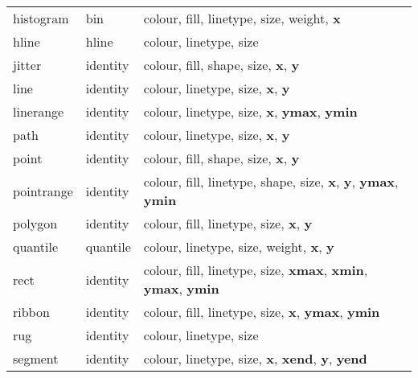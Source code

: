 \begin{table}
\begin{center}
\begin{tabular}{llp{3in}}
  histogram  & bin       & colour, fill, linetype, size, weight, \textbf{x}                                                                          \\
  hline      & hline     & colour, linetype, size                                                                                                     \\
  jitter     & identity  & colour, fill, shape, size, \textbf{x}, \textbf{y}                                                                        \\
  line       & identity  & colour, linetype, size, \textbf{x}, \textbf{y}                                                                           \\
  linerange  & identity  & colour, linetype, size, \textbf{x}, \textbf{ymax}, \textbf{ymin}                                                        \\
  path       & identity  & colour, linetype, size, \textbf{x}, \textbf{y}                                                                           \\
  point      & identity  & colour, fill, shape, size, \textbf{x}, \textbf{y}                                                                        \\
  pointrange & identity  & colour, fill, linetype, shape, size, \textbf{x}, \textbf{y}, \textbf{ymax}, \textbf{ymin}                              \\
  polygon    & identity  & colour, fill, linetype, size, \textbf{x}, \textbf{y}                                                                     \\
  quantile   & quantile  & colour, linetype, size, weight, \textbf{x}, \textbf{y}                                                                   \\
  rect       & identity  & colour, fill, linetype, size, \textbf{xmax}, \textbf{xmin}, \textbf{ymax}, \textbf{ymin}                               \\
  ribbon     & identity  & colour, fill, linetype, size, \textbf{x}, \textbf{ymax}, \textbf{ymin}                                                  \\
  rug        & identity  & colour, linetype, size                                                                                                     \\
  segment    & identity  & colour, linetype, size, \textbf{x}, \textbf{xend}, \textbf{y}, \textbf{yend}                                           \\

\end{tabular}
\end{center}
\end{table}
